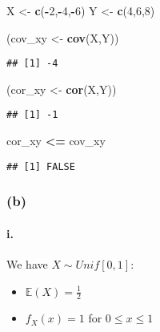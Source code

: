 \documentclass[]{article}
\newenvironment{Shaded}{\begin{snugshade}}{\end{snugshade}}
\newcommand{\DecValTok}[1]{\textcolor[rgb]{0.00,0.00,0.81}{#1}}
\newcommand{\KeywordTok}[1]{\textcolor[rgb]{0.13,0.29,0.53}{\textbf{#1}}}
\newcommand{\NormalTok}[1]{#1}
\newcommand{\OperatorTok}[1]{\textcolor[rgb]{0.81,0.36,0.00}{\textbf{#1}}}
\newcommand{\StringTok}[1]{\textcolor[rgb]{0.31,0.60,0.02}{#1}}
\let\oldparagraph\paragraph
\renewcommand{\paragraph}[1]{\oldparagraph{#1}\mbox{}}
\begin{document}
\begin{Shaded}
\begin{Highlighting}[]
\NormalTok{X <-}\StringTok{ }\KeywordTok{c}\NormalTok{(}\OperatorTok{-}\DecValTok{2}\NormalTok{,}\OperatorTok{-}\DecValTok{4}\NormalTok{,}\OperatorTok{-}\DecValTok{6}\NormalTok{)}
\NormalTok{Y <-}\StringTok{ }\KeywordTok{c}\NormalTok{(}\DecValTok{4}\NormalTok{,}\DecValTok{6}\NormalTok{,}\DecValTok{8}\NormalTok{)}

\NormalTok{(cov_xy <-}\StringTok{ }\KeywordTok{cov}\NormalTok{(X,Y))}
\end{Highlighting}
\end{Shaded}

\begin{verbatim}
## [1] -4
\end{verbatim}

\begin{Shaded}
\begin{Highlighting}[]
\NormalTok{(cor_xy <-}\StringTok{ }\KeywordTok{cor}\NormalTok{(X,Y))}
\end{Highlighting}
\end{Shaded}

\begin{verbatim}
## [1] -1
\end{verbatim}

\begin{Shaded}
\begin{Highlighting}[]
\NormalTok{cor_xy }\OperatorTok{<=}\StringTok{ }\NormalTok{cov_xy}
\end{Highlighting}
\end{Shaded}

\begin{verbatim}
## [1] FALSE
\end{verbatim}

\hypertarget{b}{%
\subsubsection{(b)}\label{b}}

\hypertarget{i.-1}{%
\paragraph{i.}\label{i.-1}}

We have \(X \sim Unif[0,1]\):

\begin{itemize}
\item
  \(\mathbb{E}(X) = \frac12\)
\item
  \(f_X(x) = 1\) for \(0 \leq x \leq 1\)
\end{itemize}
\end{document}
